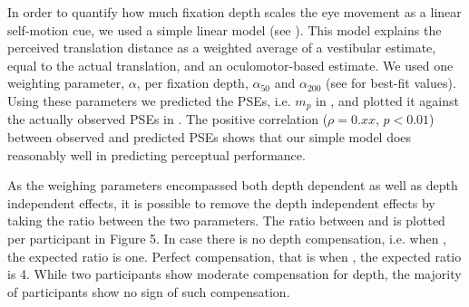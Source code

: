 In order to quantify how much fixation depth scales the eye movement as a linear self-motion cue, we used a simple linear model (see ). This model explains the perceived translation distance as a weighted average of a vestibular estimate, equal to the actual translation, and an oculomotor-based estimate. 
We used one weighting parameter, $\alpha$, per fixation depth, $\alpha_{50}$ and $\alpha_{200}$ (see  for best-fit values). Using these parameters we predicted the PSEs, i.e. $m_p$ in , and plotted it against the actually  observed PSEs in . The positive correlation ($\rho = 0.xx$, $p < 0.01$) between observed and predicted PSEs shows that our simple model does reasonably well in predicting perceptual performance.


As the weighing parameters encompassed both depth dependent as well as depth independent effects, it is possible to remove the depth independent effects by taking the ratio between the two parameters. The ratio between  and  is plotted per participant in Figure 5. In case there is no depth compensation, i.e. when , the expected ratio is one. Perfect compensation, that is when , the expected ratio is 4. While two participants show moderate compensation for depth, the majority of participants show no sign of such compensation.
